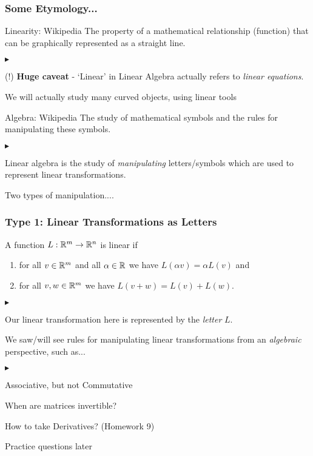 \documentclass[table]{beamer}
\renewenvironment{itemize}
\renewenvironment{enumerate}%
{\begin{list}{\arabic{enumi}.}%
      {\setlength{\leftmargin}{2.5em}%
       \setlength{\itemsep}{-\parsep}%
       \setlength{\topsep}{-\parskip}%
       \usecounter{enumi}}%
 }{\end{list}}
\renewenvironment{itemize}%
{\begin{list}{$\blacktriangleright$}%
      {\setlength{\leftmargin}{2.5em}%
       \setlength{\itemsep}{-\parsep}%
       \setlength{\topsep}{-\parskip}%
       \usecounter{enumi}}%
 }{\end{list}}
\begin{document}

\begin{frame}
\frametitle{Some Etymology...}

\begin{exampleblock}{Linearity: Wikipedia}
The property of a mathematical relationship (function) that can be graphically represented as a straight line.
\end{exampleblock}
\begin{itemize}
\item (!) \textbf{Huge caveat} - `Linear' in Linear Algebra actually refers to \textit{linear equations}.
\item We will actually study many curved objects, using linear tools
\end{itemize}

\begin{exampleblock}{Algebra: Wikipedia}
The study of mathematical symbols and the rules for manipulating these symbols.
\end{exampleblock}
\begin{itemize}
\item Linear algebra is the study of \textit{manipulating} letters/symbols which are used to represent linear transformations.
\item Two types of manipulation....
\end{itemize}
\end{frame}


\begin{frame}
\frametitle{Type 1: Linear Transformations as Letters}
\begin{definition}	        
		A function $L: \mathbb{R}^m \to \mathbb{R}^n$ is linear if
	\begin{enumerate}
		\item for all $v \in \mathbb{R}^m$ and all $\alpha \in \mathbb{R}$ we have $L(\alpha v) = \alpha L(v)$ and
		\item for all $v,w \in \mathbb{R}^m$ we have $L(v + w) = L(v) + L(w)$.
	\end{enumerate}
\end{definition}
\begin{itemize}
\item Our linear transformation here is represented by the \textit{letter} $L$.
\item We saw/will see rules for manipulating linear transformations from an \textit{algebraic} perspective, such as...
\begin{itemize}
\item Associative, but not Commutative
\item When are matrices invertible?
\item How to take Derivatives? (Homework 9)
\end{itemize}
\item Practice questions later
\end{itemize}
\end{frame}
\end{document}
